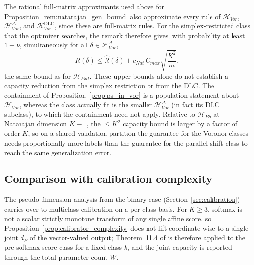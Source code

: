 The rational full-matrix approximants used above for Proposition~\ref{rem:natarajan_gen_bound} also approximate every rule of $\mathcal{H}_{Vor}$, $\mathcal{H}_{Vor}^{\Delta}$, and $\mathcal{H}_{Vor}^{\mathrm{DLC}}$, since these are full-matrix rules. For the simplex-restricted class that the optimizer searches, the remark therefore gives, with probability at least $1-\nu$, simultaneously for all $\delta \in \mathcal{H}_{Vor}^{\Delta}$,
\begin{equation}
    R(\delta) \leq \hat{R}(\delta) + c_{Nat}\, C_{max} \sqrt{\frac{K^2}{m}},
\end{equation}
the same bound as for $\mathcal{H}_{Full}$. These upper bounds alone do not establish a capacity reduction from the simplex restriction or from the DLC. The containment of Proposition~\ref{prop:ps_in_vor} is a population statement about $\mathcal{H}_{Vor}$, whereas the class actually fit is the smaller $\mathcal{H}_{Vor}^{\Delta}$ (in fact its DLC subclass), to which the containment need not apply. Relative to $\mathcal{H}_{PS}$ at Natarajan dimension $K-1$, the $\leq K^2$ capacity bound is larger by a factor of order $K$, so on a shared validation partition the guarantee for the Voronoi classes needs proportionally more labels than the guarantee for the parallel-shift class to reach the same generalization error.

\subsection{Comparison with calibration complexity}

The pseudo-dimension analysis from the binary case (Section~\ref{sec:calibration}) carries over to multiclass calibration on a per-class basis. For $K \geq 3$, softmax is not a scalar strictly monotone transform of any single affine score, so Proposition~\ref{prop:calibrator_complexity} does not lift coordinate-wise to a single joint $d_P$ of the vector-valued output; Theorem~11.4 of \citet{anthony1999neural} is therefore applied to the pre-softmax score class for a fixed class $k$, and the joint capacity is reported through the total parameter count $W$.

